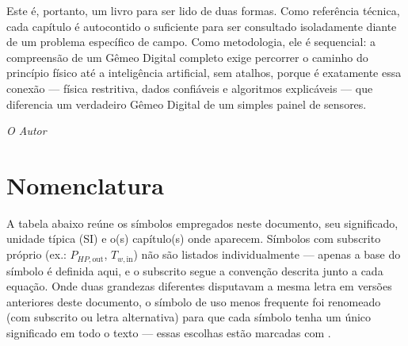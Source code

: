 \documentclass[12pt,a4paper]{article}
\numberwithin{equation}{section}
\numberwithin{table}{section}
\numberwithin{figure}{section}
\begin{document}
Este é, portanto, um livro para ser lido de duas formas. Como referência técnica, cada capítulo é autocontido o suficiente para ser consultado isoladamente diante de um problema específico de campo. Como metodologia, ele é sequencial: a compreensão de um Gêmeo Digital completo exige percorrer o caminho do princípio físico até a inteligência artificial, sem atalhos, porque é exatamente essa conexão — física restritiva, dados confiáveis e algoritmos explicáveis — que diferencia um verdadeiro Gêmeo Digital de um simples painel de sensores.

\vspace{1em}
\hfill \textit{O Autor}

	\newpage
	\tableofcontents
	\newpage

\newpage
\section*{Nomenclatura}

A tabela abaixo reúne os símbolos empregados neste documento, seu significado, unidade típica (SI) e o(s) capítulo(s) onde aparecem. Símbolos com subscrito próprio (ex.: $P_{HP,\text{out}}$, $T_{w,\text{in}}$) não são listados individualmente — apenas a base do símbolo é definida aqui, e o subscrito segue a convenção descrita junto a cada equação. Onde duas grandezas diferentes disputavam a mesma letra em versões anteriores deste documento, o símbolo de uso menos frequente foi renomeado (com subscrito ou letra alternativa) para que cada símbolo tenha um único significado em todo o texto — essas escolhas estão marcadas com \dag.
\end{document}
